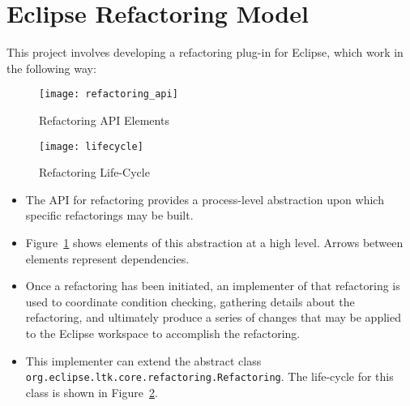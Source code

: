 \section{Eclipse Refactoring Model}

This project involves developing a refactoring plug-in for Eclipse, which work
in the following way:

\begin{figure}
    \centering
    \texttt{[image: refactoring\_api]}
    \caption{Refactoring API Elements}
\label{fig:refact_api}
\end{figure}

\begin{figure}
    \centering
    \texttt{[image: lifecycle]}
    \caption{Refactoring Life-Cycle}
\label{fig:lifecycle}
\end{figure}

\begin{itemize}   

 \item The API for refactoring provides a process-level abstraction upon which
     specific refactorings may be built. 

 \item Figure~\ref{fig:refact_api} shows elements of this abstraction at a
     high level. Arrows between elements represent dependencies.

 \item Once a refactoring has been initiated, an implementer of that
     refactoring is used to coordinate condition checking, gathering details
     about the refactoring, and ultimately produce a series of changes that
     may be applied to the Eclipse workspace to accomplish the refactoring. 

 \item This implementer can extend the abstract class\\
     \lstinline{org.eclipse.ltk.core.refactoring.Refactoring}. The life-cycle
     for this class is shown in Figure~\ref{fig:lifecycle}. 


\end{itemize}
